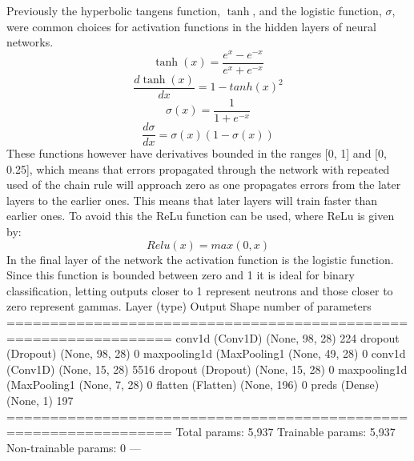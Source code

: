 \documentclass[main.tex]{subfiles}
\begin{document}
Previously the hyperbolic tangens function, $\tanh$, and the logistic function, $\sigma$, were common choices for activation functions in the hidden layers of neural networks.
\begin{equation}
\tanh(x) = \frac{e^x - e^{-x}}{e^x + e^{-x}}
\end{equation}
\begin{equation}
\frac{d\tanh(x)}{dx}= 1 -tanh(x)^2
\end{equation}
\begin{equation}
	\sigma(x) = \frac{1}{1+e^{-x}}
\end{equation}
\begin{equation}
\frac{d\sigma}{dx} = \sigma(x)(1-\sigma(x))
\end{equation}
These functions however have derivatives bounded in the ranges [0, 1] and [0, 0.25], which means that errors propagated through the network with repeated used of the chain rule will approach zero as one propagates errors from the later layers to the earlier ones. This means that later layers will train faster than earlier ones. To avoid this the ReLu function can be used, where ReLu is given by:
\begin{equation}
	Relu(x) = max(0,x)
\end{equation}
In the final layer of the network the activation function is the logistic function. Since this function is bounded between zero and 1 it is ideal for binary classification, letting outputs closer to 1 represent neutrons and those closer to zero represent gammas.
Layer (type)                 Output Shape              number of parameters   
\newline =================================================================
\newline conv1d (Conv1D)            (None, 98, 28)            224       
\newline dropout (Dropout)          (None, 98, 28)            0         
\newline maxpooling1d (MaxPooling1 (None, 49, 28)            0         
\newline conv1d (Conv1D)            (None, 15, 28)            5516      
\newline dropout (Dropout)          (None, 15, 28)            0         
\newline maxpooling1d (MaxPooling1 (None, 7, 28)             0         
\newline flatten (Flatten)          (None, 196)               0         
\newline preds (Dense)                (None, 1)                 197       
\newline =================================================================
\newline Total params: 5,937
\newline Trainable params: 5,937
\newline Non-trainable params: 0
---
\end{document}
